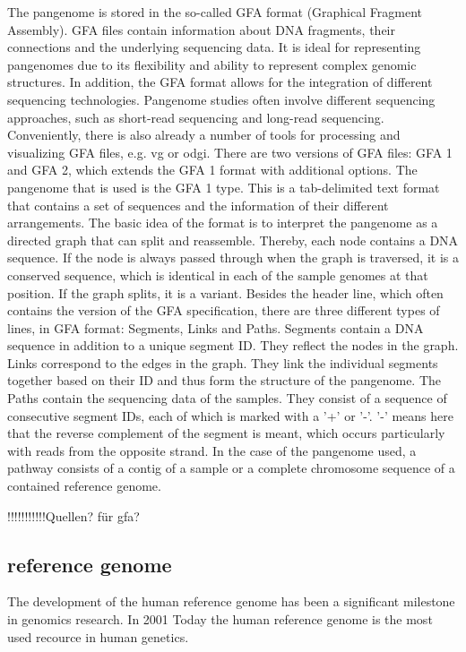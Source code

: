 \documentclass[a4paper,11pt,twoside,openright]{report}
\begin{document}
The pangenome is stored in the so-called GFA format (Graphical Fragment Assembly). \cite{siren2022gbz} GFA files contain information about DNA fragments, their connections and the underlying sequencing data. It is ideal for representing pangenomes due to its flexibility and ability to represent complex genomic structures. In addition, the GFA format allows for the integration of different sequencing technologies. Pangenome studies often involve different sequencing approaches, such as short-read sequencing and long-read sequencing. Conveniently, there is also already a number of tools for processing and visualizing GFA files, e.g. vg or odgi.
There are two versions of GFA files: GFA 1 and GFA 2, which extends the GFA 1 format with additional options.
The pangenome that is used is the GFA 1 type. This is a tab-delimited text format that contains a set of sequences and the information of their different arrangements. The basic idea of the format is to interpret the pangenome as a directed graph that can split and reassemble. Thereby, each node contains a DNA sequence. If the node is always passed through when the graph is traversed, it is a conserved sequence, which is identical in each of the sample genomes at that position. If the graph splits, it is a variant.
Besides the header line, which often contains the version of the GFA specification, there are three different types of lines, in GFA format: Segments, Links and Paths.
Segments contain a DNA sequence in addition to a unique segment ID. They reflect the nodes in the graph. Links correspond to the edges in the graph. They link the individual segments together based on their ID and thus form the structure of the pangenome.
The Paths contain the sequencing data of the samples. They consist of a sequence of consecutive segment IDs, each of which is marked with a '+' or '-'. '-' means here that the reverse complement of the segment is meant, which occurs particularly with reads from the opposite strand.
In the case of the pangenome used, a pathway consists of a contig of a sample or a complete chromosome sequence of a contained reference genome.

!!!!!!!!!!!Quellen? für gfa?

\subsection{reference genome}
The development of the human reference genome has been a significant milestone in genomics research. In 2001
Today the human reference genome is the most used recource in human genetics. \cite{wang2022human}
\end{document}
